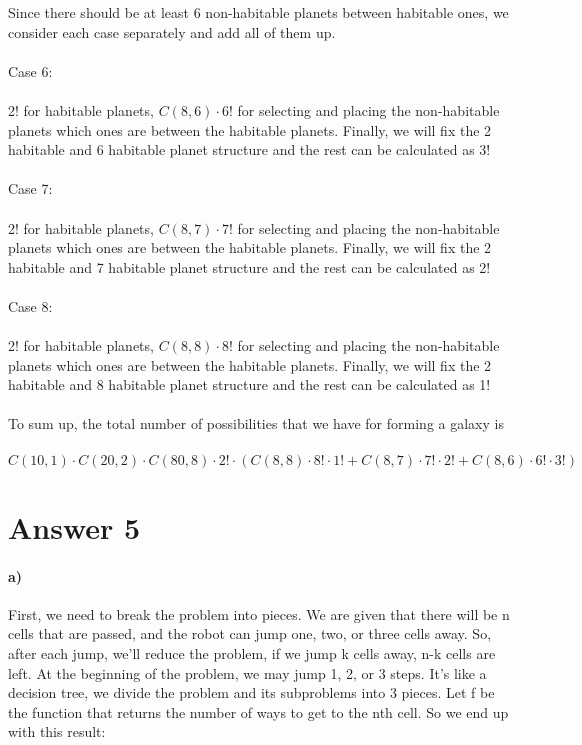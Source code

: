 \documentclass[12pt]{article}
\begin{document}
Since there should be at least 6 non-habitable planets between habitable ones, we consider each case separately and add all of them up. \\\\

\noindent Case 6: \\\\
2! for habitable planets, $C(8,6)\cdot 6!$ for selecting and placing the non-habitable planets which ones are between the habitable planets. Finally, we will fix the 2 habitable and 6 habitable planet structure and the rest can be calculated as 3!\\\\

\noindent Case 7: \\\\
2! for habitable planets, $C(8,7)\cdot 7!$ for selecting and placing the non-habitable planets which ones are between the habitable planets. Finally, we will fix the 2 habitable and 7 habitable planet structure and the rest can be calculated as 2!\\\\
Case 8: \\\\
2! for habitable planets, $C(8,8)\cdot 8!$ for selecting and placing the non-habitable planets which ones are between the habitable planets. Finally, we will fix the 2 habitable and 8 habitable planet structure and the rest can be calculated as 1!\\\\

To sum up, the total number of possibilities that we have for forming a galaxy is \\\\
\textbf{$C(10,1)\cdot C(20,2)\cdot C(80,8) \cdot 2! \cdot (C(8,8)\cdot 8!\cdot1! + C(8,7)\cdot7!\cdot 2! + C(8,6)\cdot6!\cdot3!)$}

\section*{Answer 5}
\paragraph{a)} 
First, we need to break the problem into pieces. We are given that there will be n cells that are passed, and the robot can jump one, two, or three cells away. So, after each jump, we'll reduce the problem, if we jump k cells away, n-k cells are left. At the beginning of the problem, we may jump 1, 2, or 3 steps. It's like a decision tree, we divide the problem and its subproblems into 3 pieces. Let f be the function that returns the number of ways to get to the nth cell. So we end up with this result:\\\\
\end{document}
